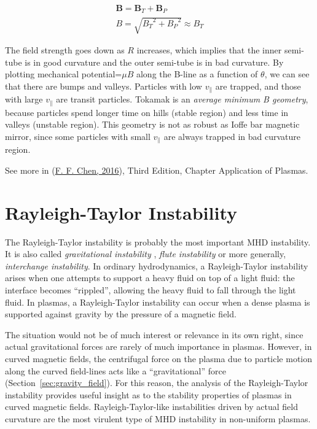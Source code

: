 \documentclass[
  notoc %
]{tufte-book}
\begin{document}
\[
\begin{aligned}
\mathbf{B}=\mathbf{B}_T+\mathbf{B}_P \\
B=\sqrt{{B_T}^2+{B_P}^2}\approx B_T
\end{aligned}
\]

The field strength goes down as \(R\) increases, which implies that the
inner semi-tube is in good curvature and the outer semi-tube is in bad
curvature. By plotting mechanical potential=\(\mu B\) along the B-line
as a function of \(\theta\), we can see that there are bumps and
valleys. Particles with low \(v_\parallel\) are trapped, and those with
large \(v_\parallel\) are transit particles. Tokamak is an \emph{average
minimum B geometry}, because particles spend longer time on hills
(stable region) and less time in valleys (unstable region). This
geometry is not as robust as Ioffe bar magnetic mirror, since some
particles with small \(v_\parallel\) are always trapped in bad curvature
region.

See more in (\protect\hyperlink{ref-chen2016introduction}{F. F. Chen,
2016}), Third Edition, Chapter Application of Plasmas.

\hypertarget{sec:RT}{%
\section{Rayleigh-Taylor Instability}\label{sec:RT}}

The Rayleigh-Taylor instability is probably the most important MHD
instability. It is also called \emph{gravitational instability} ,
\emph{flute instability} or more generally, \emph{interchange
instability}. In ordinary hydrodynamics, a Rayleigh-Taylor instability
arises when one attempts to support a heavy fluid on top of a light
fluid: the interface becomes ``rippled'', allowing the heavy fluid to
fall through the light fluid. In plasmas, a Rayleigh-Taylor instability
can occur when a dense plasma is supported against gravity by the
pressure of a magnetic field.

The situation would not be of much interest or relevance in its own
right, since actual gravitational forces are rarely of much importance
in plasmas. However, in curved magnetic fields, the centrifugal force on
the plasma due to particle motion along the curved field-lines acts like
a ``gravitational'' force (Section~\ref{sec:gravity_field}). For this
reason, the analysis of the Rayleigh-Taylor instability provides useful
insight as to the stability properties of plasmas in curved magnetic
fields. Rayleigh-Taylor-like instabilities driven by actual field
curvature are the most virulent type of MHD instability in non-uniform
plasmas.
\end{document}
